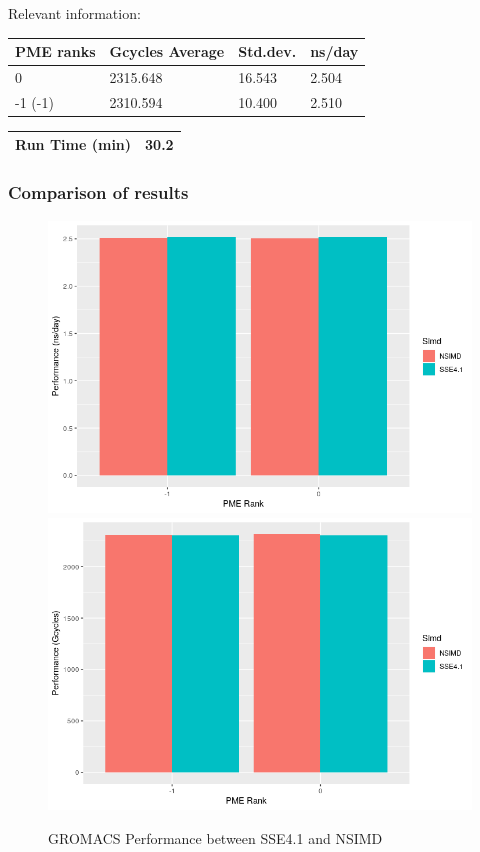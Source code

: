 Relevant information:
\begin{center}
    \begin{tabular}{|p{3.5cm}|p{3.5cm}|p{3.5cm}|p{3.5cm}|} \hline
         PME ranks & Gcycles Average & Std.dev. & ns/day \\ \hline
         0 & 2315.648  & 16.543  & 2.504  \\ \hline
         -1 (-1) & 2310.594 & 10.400 & 2.510  \\ \hline
    \end{tabular}
    \begin{tabular}{|p{3.5cm}|p{11.4cm}|} \hline
         Run Time (min) & 30.2 \\ \hline
    \end{tabular}
\end{center}
\subsubsection{Comparison of results}

\begin{figure}[!h]
\centering
        \includegraphics[scale=0.8]{SSE41.png}
        \includegraphics[scale=0.8]{SSE41_2.png}
        \caption{GROMACS Performance between SSE4.1 and NSIMD}
        \label{fg:f2}
\end{figure}
\newpage


